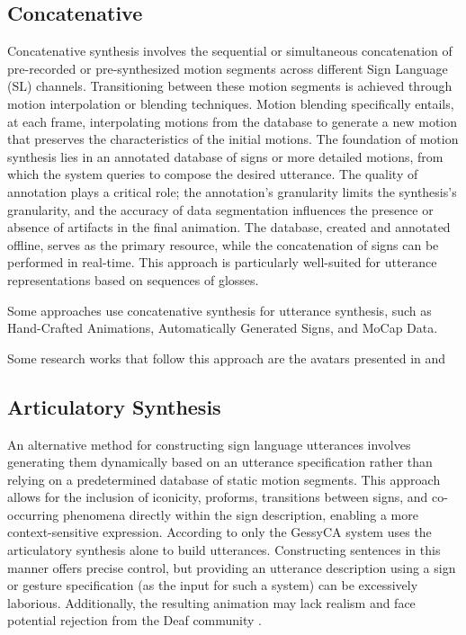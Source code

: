 \subsection{Concatenative}

Concatenative synthesis involves the sequential or simultaneous concatenation of pre-recorded or pre-synthesized motion segments across different Sign Language (SL) channels. Transitioning between these motion segments is achieved through motion interpolation or blending techniques. 
Motion blending specifically entails, at each frame, interpolating motions from the database to generate a new motion that preserves the characteristics of the initial motions. The foundation of motion synthesis lies in an annotated database of signs or more detailed motions, from which the system queries to compose the desired utterance. The quality of annotation plays a critical role; the annotation's granularity limits the synthesis's granularity, and the accuracy of data segmentation influences the presence or absence of artifacts in the final animation. The database, created and annotated offline, serves as the primary resource, while the concatenation of signs can be performed in real-time. This approach is particularly well-suited for utterance representations based on sequences of glosses. 

Some approaches use concatenative synthesis for utterance synthesis, such as Hand-Crafted Animations, Automatically Generated Signs, and MoCap Data.


Some research works that follow this approach are the avatars presented in \parencite{braffort2007demonstrations} and \parencite{paulaAvatar} 


\subsection{Articulatory Synthesis}

An alternative method for constructing sign language utterances involves generating them dynamically based on an utterance specification rather than relying on a predetermined database of static motion segments. This approach allows for the inclusion of iconicity, proforms, transitions between signs, and co-occurring phenomena directly within the sign description, enabling a more context-sensitive expression. According to \parencite{naert2020survey} only the GessyCA system \parencite{lebourque1999high} uses the articulatory synthesis alone to build utterances.
Constructing sentences in this manner offers precise control, but providing an utterance description using a sign or gesture specification (as the input for such a system) can be excessively laborious. Additionally, the resulting animation may lack realism and face potential rejection from the Deaf community \parencite{naert2020survey}.

